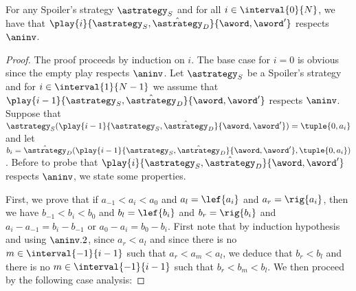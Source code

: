 \begin{lemma}
\label{lem-strat-win}
For any Spoiler's strategy $\astrategy_S$ and for all $i \in \interval{0}{N}$, we have that $\play{i}{\astrategy_S,\hat\astrategy_D}{\aword,\aword'}$ respects $\aninv$.
\end{lemma}
\begin{proof}
The proof proceeds by induction on $i$. The base case for $i=0$ is obvious since the empty play respects $\aninv$. Let $\astrategy_S$ be a Spoiler's strategy and for $i \in \interval{1}{N-1}$ we assume that $\play{i-1}{\astrategy_S,\hat\astrategy_D}{\aword,\aword'}$ respects $\aninv$. Suppose that $\astrategy_S(\play{i-1}{\astrategy_S,\hat\astrategy_D}{\aword,\aword'})=\tuple{0,a_i}$ and let $b_i=\hat\astrategy_D(\play{i-1}{\astrategy_S,\hat\astrategy_D}{\aword,\aword'},\tuple{0,a_i})$. Before to probe that $\play{i}{\astrategy_S,\hat\astrategy_D}{\aword,\aword'}$ respects $\aninv$, we state some properties.

First, we prove that if $a_{-1} < a_i < a_0$ and $a_l=\lef{a_i}$ and $a_r=\rig{a_i}$, then we have $b_{-1}<b_i <b_0$ and $b_l=\lef{b_i}$ and $b_r=\rig{b_i}$ and $a_{i}-a_{-1}=b_{i}-b_{-1}$ or $a_{0}-a_{i}=b_{0}-b_{i}$. First note that by induction hypothesis and using $\aninv.2$, since $a_r < a_l$ and since there is no $m \in \interval{-1}{i-1}$ such that $a_r < a_m < a_l$, we deduce that $b_r < b_l$ and there is no $m \in \interval{-1}{i-1}$ such that $b_r < b_m < b_l$. We then proceed by the following case analysis:


\end{proof}
